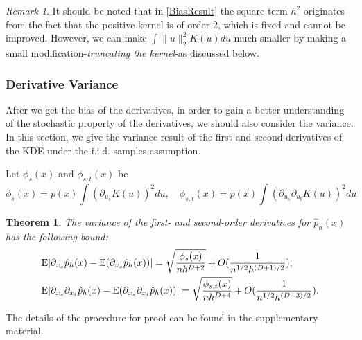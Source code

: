 \documentclass[aos,preprint]{imsart}
\newtheorem{theorem}{Theorem}[section]
\theoremstyle{remark}
\newtheorem*{remark}{Remark}
\begin{document}

\begin{remark}
It should be noted that in \eqref{BiasResult} the square term $h^2$ originates from the fact that the positive kernel is of order 2, which is fixed and cannot be improved. However, we can make $\int \|u\|_2^2 K(u)du$ much smaller by making a small modification-{\it truncating the kernel}-as discussed below.
\end{remark}
\subsubsection{Derivative Variance}
After we get the bias of the derivatives, in order to gain a better understanding of the stochastic property of the derivatives, we should also consider the variance. In this section, we give the variance result of the first and second derivatives of the KDE under the i.i.d. samples assumption. 

Let $\phi_s(x)$ and $\phi_{s,t}(x)$ be
\[
\phi_s(x) = p(x) \int (\partial_{ u_s } K (u) )^2 du,\quad  \phi_{s,t}(x) = p(x) \int (\partial_{u_s}\partial_{u_t} K (u) )^2 du
\]
\begin{theorem}
The variance of the first- and second-order derivatives for $\hat{p}_h(x)$ has the following bound: 
\begin{equation*}\label{VarResult}
\begin{aligned}
&{\rm E} |\partial_{x_s} \hat{p}_h(x)-{\rm E}(\partial_{x_s} \hat{p}_h(x))| = \sqrt{\frac{\phi_s(x)}{n h^{D+2}}}+O(\frac{1}{n^{1/2}h^{(D+1)/2}}),\\
&{\rm E} | \partial_{x_s}\partial_{x_t} \hat{p}_h(x) -{\rm E}(\partial_{x_s}\partial_{x_t} \hat{p}_h(x))| = \sqrt{\frac{\phi_{s,t}(x)}{nh^{D+4}}}+O(\frac{1}{n^{1/2}h^{(D+3)/2}}).
\end{aligned}
\end{equation*}
\end{theorem}
The details of the procedure for proof can be found in the supplementary material. %
\end{document}
